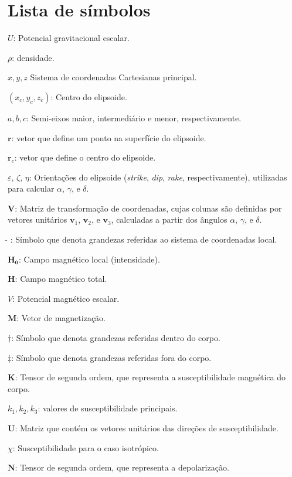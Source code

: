 \setlength\parindent{0pt}
\chapter{Lista de símbolos}

$U$: Potencial gravitacional escalar.

$\rho$: densidade.

$x, y, z$ Sistema de coordenadas Cartesianas principal.

$(x_{c}, y_{c}, z_{c})$: Centro do elipsoide.

$a, b, c$: Semi-eixos maior, intermediário e menor, respectivamente.

$\mathbf{r}$: vetor que define um ponto na superfície do elipsoide.

$\mathbf{r}_c$: vetor que define o centro do elipsoide.

$\varepsilon$, $\zeta$, $\eta$: Orientações do elipsoide (\textit{strike}, \textit{dip}, \textit{rake}, respectivamente), utilizadas para calcular $\alpha$, $\gamma$, e $\delta$.

$\mathbf{V}$: Matriz de transformação de coordenadas, cujas colunas são definidas por vetores unitários $\mathbf{v}_{1}$, $\mathbf{v}_{2}$, e $\mathbf{v}_{3}$, calculadas a partir dos ângulos $\alpha$, $\gamma$, e $\delta$.

$\tilde{ }\,\,$: Símbolo que denota grandezas referidas ao sistema de coordenadas local.

$\mathbf{{H}_{0}}$: Campo magnético local (intensidade).

$\mathbf{H}$: Campo magnético total.

$V$: Potencial magnético escalar.

$\mathbf{M}$: Vetor de magnetização.

${\dagger}$: Símbolo que denota grandezas referidas dentro do corpo.

${\ddagger}$: Símbolo que denota grandezas referidas fora do corpo.

$\mathbf{K}$: Tensor de segunda ordem, que representa a susceptibilidade magnética do corpo.

$k_1,k_2, k_3$: valores de susceptibilidade principais.

$\mathbf{U}$: Matriz que contém os vetores unitários das direções de susceptibilidade.

$\chi$: Susceptibilidade para o caso isotrópico.

$\mathbf{N}$: Tensor de segunda ordem, que representa a depolarização.

